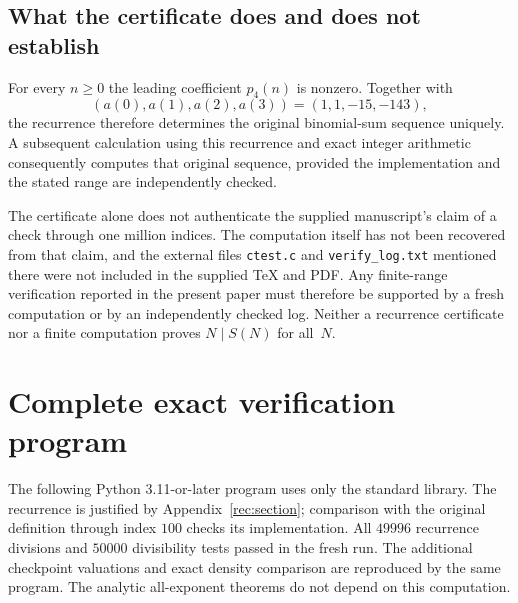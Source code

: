 \documentclass[11pt,a4paper]{article}
\theoremstyle{remark}\newtheorem{remark}[theorem]{Remark}
\begin{document}
\subsection{What the certificate does and does not establish}

For every $n\geq0$ the leading coefficient $p_4(n)$ is nonzero.
Together with
\begin{equation}\label{rec:initial-values}
 (a(0),a(1),a(2),a(3))=(1,1,-15,-143),
\end{equation}
the recurrence therefore determines the original binomial-sum
sequence uniquely.  A subsequent calculation using this recurrence
and exact integer arithmetic consequently computes that original
sequence, provided the implementation and the stated range are
independently checked.

The certificate alone does not authenticate the supplied manuscript's
claim of a check through one million indices.  The computation itself
has not been recovered from that claim, and the external files
\texttt{ctest.c} and \texttt{verify\_log.txt} mentioned there were not
included in the supplied \TeX{} and PDF.  Any finite-range verification
reported in the present paper must therefore be supported by a fresh
computation or by an independently checked log.  Neither a recurrence
certificate nor a finite computation proves $N\mid S(N)$ for all~$N$.

\section{Complete exact verification program}\label{app:verify}

The following Python 3.11-or-later program uses only the standard library.
The recurrence is justified by Appendix~\ref{rec:section}; comparison
with the original definition through index \(100\) checks its implementation.
All \(49996\) recurrence divisions and \(50000\) divisibility tests passed in the
fresh run. The additional checkpoint valuations and exact density
comparison are reproduced by the same program.
The analytic all-exponent theorems do not depend on this computation.
\end{document}
